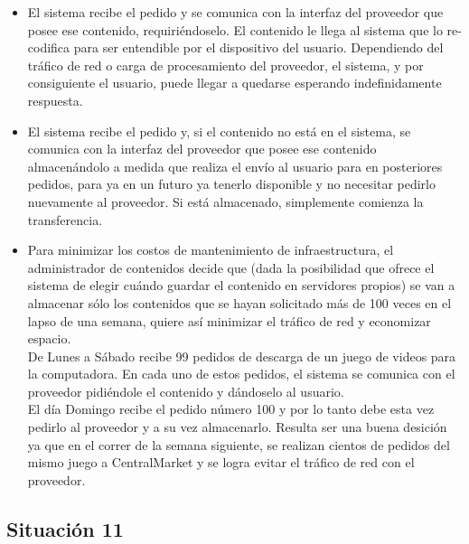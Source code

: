 \documentclass[11pt, a4paper, spanish]{article}
\begin{document}
	\begin{itemize}
	
	\item{ El sistema recibe el pedido y se comunica con la interfaz del proveedor que posee ese contenido, requiri\'endoselo. El contenido le 
   llega al sistema que lo re-codifica para ser entendible por el dispositivo del usuario. Dependiendo del tr\'afico de red o carga de procesamiento 
   del proveedor, el sistema, y por consiguiente el usuario, puede llegar a quedarse esperando indefinidamente respuesta.}

	\item{ El sistema recibe el pedido y, si el contenido no est\'a en el sistema, se comunica con la interfaz del proveedor que posee ese 
   contenido almacen\'andolo a medida que realiza el env\'io al usuario para en posteriores pedidos, para ya en un futuro ya tenerlo disponible y no 
   necesitar pedirlo nuevamente al proveedor. Si est\'a almacenado, simplemente comienza la transferencia.}

	\item{ Para minimizar los costos de mantenimiento de infraestructura, el administrador de contenidos decide que (dada la posibilidad que ofrece 
   el sistema de elegir cu\'ando guardar el contenido en servidores propios) se van a almacenar s\'olo los contenidos que se hayan solicitado m\'as de 
   100 veces en el lapso de una semana, quiere as\'i minimizar el tr\'afico de red y economizar espacio.}\\

	De Lunes a S\'abado recibe 99 pedidos de descarga de un juego de videos para la computadora. En cada uno de estos pedidos, el sistema se 
   comunica con el proveedor pidi\'endole el contenido y d\'andoselo al usuario.\\

	El d\'ia Domingo recibe el pedido n\'umero 100 y por lo tanto debe esta vez pedirlo al proveedor y a su vez almacenarlo. Resulta ser una buena 
   desici\'on ya que en el correr de la semana siguiente, se realizan cientos de pedidos del mismo juego a CentralMarket y se logra evitar el tr\'afico 
   de red con el proveedor.

	\end{itemize}

\newpage

\subsection{Situaci\'on 11}
\end{document}
